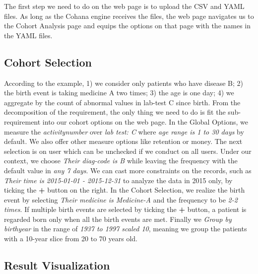 \documentclass[10pt,conference,letterpaper]{IEEEtran}
\begin{document}
The first step we need to do on the web page is to upload the CSV and YAML files. As long as the Cohana engine receives the files, the web page navigates us to the Cohort Analysis page and equips the options on that page with the names in the YAML files.

\subsection{Cohort Selection}

According to the example, 1) we consider only patients who have disease B; 2) the birth event is taking medicine A two times; 3) the age is one day; 4) we aggregate by the count of abnormal values in lab-test C since birth. From the decomposition of the requirement, the only thing we need to do is fit the sub-requirement into our cohort options on the web page. In the Global Options, we measure the \emph{activity\textunderscore number} over \emph{lab test: C} where \emph{age range is 1 to 30 days} by default. We also offer other measure options like retention or money. The next selection is on user which can be unchecked if we conduct on all users. Under our context, we choose \emph{Their diag-code is B} while leaving the frequency with the default value in \emph{any 7 days}. We can cast more constraints on the records, such as \emph{Their time is 2015-01-01 - 2015-12-31} to analyze the data in 2015 only, by ticking the \textbf{+} button on the right. In the Cohort Selection, we realize the birth event by selecting \emph{Their medicine is Medicine-A} and the frequency to be \emph{2-2 times}. If multiple birth events are selected by ticking the \textbf{+} button, a patient is regarded born only when all the birth events are met. Finally we \emph{Group by birthyear} in the range of \emph{1937 to 1997 scaled 10}, meaning we group the patients with a 10-year slice from 20 to 70 years old.

\subsection{Result Visualization}
\end{document}
